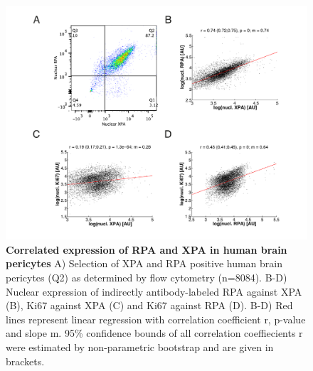 \begin{figure}[htbp]
	\begin{center}
		\includegraphics[width=1\textwidth]{Abbildungen/figureTAC_3.pdf}
		\caption{\textbf{Correlated expression of RPA and XPA in human brain pericytes} A) Selection of XPA and RPA positive human brain pericytes (Q2) as determined by flow cytometry (n=8084). B-D) Nuclear expression of indirectly antibody-labeled RPA against XPA (B), Ki67 against XPA (C) and Ki67 against RPA (D). B-D) Red lines represent linear regression with correlation coefficient r, p-value and slope m. 95\% confidence bounds of all correlation coeffiecients r were estimated by non-parametric bootstrap and are given in brackets.}
		\label{fig:FC_correlation}
	\end{center}
\end{figure}

